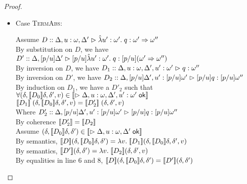 \begin{proof}
\begin{enumerate}
\begin{itemize}
  \item Case \textsc{TermAbs}:
    \begin{tabbedproof}
      \oo Assume $D :: \judgeA[{\Delta, u:\omega, \Delta'}]{\pfun{u'}{\omega'}{q}}{\omega' \To \omega''}$ \\
      \ooo By substitution on $D$, we have 
           $D' :: \judgeA[{\Delta, [p/u]\Delta'}]{[p/u]\pfun{u'}{\omega'}{q}}{[p/u](\omega' \To \omega'')}$ \\
      \ooo By inversion on $D$, we have 
           $D_1 :: \judgeA[{\Delta, u:\omega, \Delta', u':\omega'}]{q}{\omega''}$ \\
      \ooo By inversion on $D'$, we have 
           $D_2 :: \judgeA[{\Delta, [p/u]\Delta', u':[p/u]\omega'}]{[p/u]q}{[p/u]\omega''}$ \\
      \ooo By induction on $D_1$, we have a $D'_2$ such that \\
      \ooo $\forall (\delta, \interp{D_0}\delta, \delta', v) \in \interp{\judgeACtx{\Delta, u:\omega, \Delta', u':\omega'}}$ \\
      \ooox $\interp{D_1}\;(\delta, \interp{D_0}\delta, \delta', v) = 
             \interp{D'_2}\;(\delta, \delta', v)$ \\
      \ooo Where $D'_2 :: \judgeA[{\Delta, [p/u]\Delta', u':[p/u]\omega'}]{[p/u]q}{[p/u]\omega''}$ \\
      \ooo By coherence $\interp{D'_2} = \interp{D_2}$ \\
      \ooo Assume $(\delta, \interp{D_0}\delta, \delta') \in 
                   \interp{\judgeACtx{\Delta, u:\omega, \Delta'}}$ \\
      \oooo By semantics, 
            $\interp{D}(\delta, \interp{D_0}\delta, \delta') = 
             \semfun{v}{\interp{D_1}(\delta, \interp{D_0}\delta, \delta', v)}$ \\
      \oooo By semantics,
            $\interp{D'}(\delta, \delta') = 
               \semfun{v}{\interp{D_2}(\delta, \delta', v)}$ \\
      \oooo By equalities in line 6 and 8, 
              $\interp{D}(\delta, \interp{D_0}\delta, \delta') =  
              \interp{D'}(\delta, \delta')$ \\
    \end{tabbedproof}


\end{itemize}
\end{enumerate}
\end{proof}
